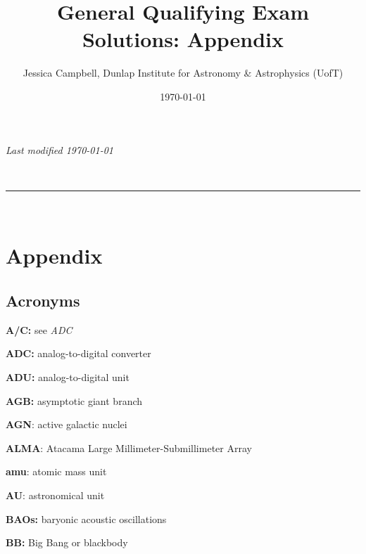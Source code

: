 \documentclass[a4paper,10pt]{article}
\makeatletter
\newcommand{\linia}{\rule{\linewidth}{0.5pt}}
\renewcommand{\maketitle}{
\begin{center}
\vspace{2ex}
{\huge \textsc{\@title}}
\vspace{1ex}
\\
\linia\\
\@author
\vspace{4ex}
\end{center}
}
\makeatother
\begin{document}
\hfill{\textit{Last modified \today}}
\title{General Qualifying Exam Solutions: Appendix}
\author{Jessica Campbell, Dunlap Institute for Astronomy \& Astrophysics (UofT)}
\date{\today}
\maketitle

\tableofcontents


\newpage
\section{Appendix}

\subsection{Acronyms}

{\noindent}\textbf{A/C:} see \textit{ADC}

{\noindent}\textbf{ADC:} analog-to-digital converter

{\noindent}\textbf{ADU:} analog-to-digital unit

{\noindent}\textbf{AGB:} asymptotic giant branch

{\noindent}\textbf{AGN}: active galactic nuclei

{\noindent}\textbf{ALMA}: Atacama Large Millimeter-Submillimeter Array

{\noindent}\textbf{amu}: atomic mass unit

{\noindent}\textbf{AU}: astronomical unit

{\noindent}\textbf{BAOs:} baryonic acoustic oscillations

{\noindent}\textbf{BB:} Big Bang or blackbody
\end{document}
